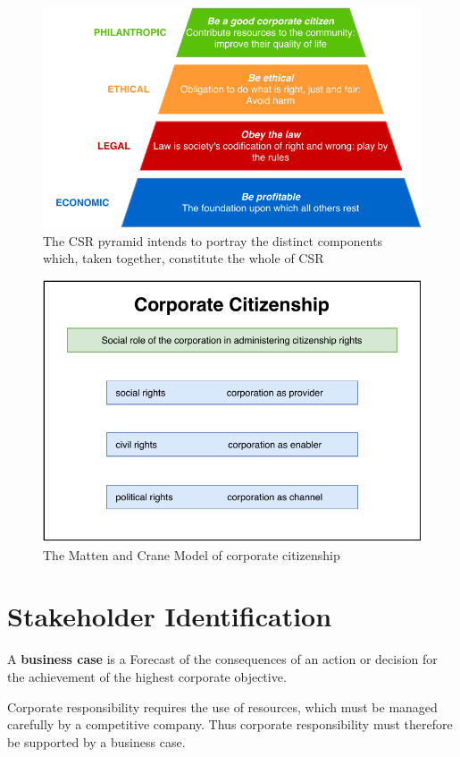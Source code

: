 \documentclass[11pt]{article}
\theoremstyle{definition}
\begin{document}
\begin{figure}[H]
	\centering
	\includegraphics[width=0.7\linewidth]{img/caroll_pyramid_corporate_responsibility.pdf}
	\caption{The CSR pyramid intends to portray the distinct components which, taken together, constitute the whole of CSR \parencite{caroll1991pyramid}}
\end{figure}

\begin{figure}[H]
	\centering
	\includegraphics[width=0.7\linewidth]{img/Matten_Crane_corporate_citizenship.pdf}
	\caption{The Matten and Crane Model of corporate citizenship}
\end{figure}

\section{Stakeholder Identification}
\begin{definition}
	A \textbf{business case} is a Forecast of the consequences of an action or decision for the achievement of the highest corporate objective.
\end{definition}

Corporate responsibility requires the use of resources, which must be managed carefully by a competitive company. Thus corporate responsibility must therefore be supported by a business case.
\end{document}
